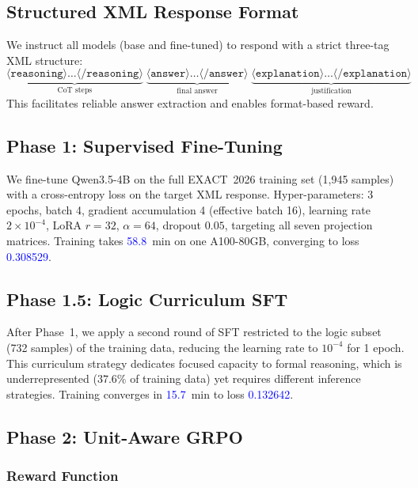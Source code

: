 \documentclass{ieeeaccess}
\newcommand{\fill}[1]{\textcolor{blue}{#1}}  %
\newcommand{\basemodelname}{Qwen3.5-4B}
\newcommand{\dataset}{EXACT~2026}
\begin{document}
\subsection{Structured XML Response Format}

We instruct all models (base and fine-tuned) to respond with a strict
three-tag XML structure:
\begin{equation}
  \underbrace{\langle\texttt{reasoning}\rangle\ldots\langle/\texttt{reasoning}\rangle}_{\text{CoT steps}}
  \;
  \underbrace{\langle\texttt{answer}\rangle\ldots\langle/\texttt{answer}\rangle}_{\text{final answer}}
  \;
  \underbrace{\langle\texttt{explanation}\rangle\ldots\langle/\texttt{explanation}\rangle}_{\text{justification}}
\end{equation}
This facilitates reliable answer extraction and enables format-based reward.

\subsection{Phase 1: Supervised Fine-Tuning}

We fine-tune \basemodelname{} on the full \dataset{} training set
(1,945 samples) with a cross-entropy loss on the target XML response.
Hyper-parameters: 3 epochs, batch 4, gradient accumulation 4 (effective
batch 16), learning rate $2 \times 10^{-4}$, LoRA $r=32$,
$\alpha=64$, dropout $0.05$, targeting all seven projection matrices.
Training takes \fill{58.8}~min on one A100-80GB, converging to
loss \fill{0.308529}.

\subsection{Phase 1.5: Logic Curriculum SFT}

After Phase~1, we apply a second round of SFT restricted to the
logic subset (732 samples) of the training data, reducing the learning rate
to $10^{-4}$ for 1 epoch.
This curriculum strategy dedicates focused capacity to formal reasoning,
which is underrepresented ($37.6\%$ of training data) yet requires different
inference strategies.
Training converges in \fill{15.7}~min to loss \fill{0.132642}.

\subsection{Phase 2: Unit-Aware GRPO}

\subsubsection{Reward Function}
\end{document}

